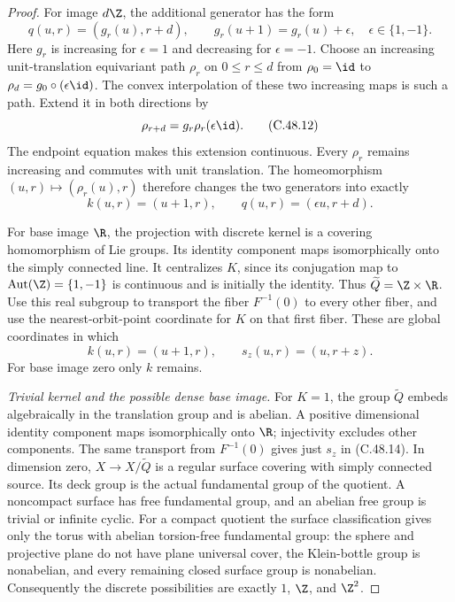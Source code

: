 \begin{proof}
For image $d\Z$, the additional generator has the form
\[
 q(u,r)=(g_r(u),r+d),\qquad
 g_r(u+1)=g_r(u)+\epsilon,\quad\epsilon\in\{1,-1\}.
                                                        \tag{C.48.11}
\]
Here $g_r$ is increasing for $\epsilon=1$ and decreasing
for $\epsilon=-1$. Choose an increasing unit-translation
equivariant path $\rho_r$ on $0\leq r\leq d$ from
$\rho_0=\id$ to $\rho_d=g_0\circ(\epsilon\id)$.
The convex interpolation of these two increasing maps
is such a path. Extend it in both directions by
\[
                 \rho_{r+d}=g_r\rho_r(\epsilon\id).
                                                        \tag{C.48.12}
\]
The endpoint equation makes this extension continuous.
Every $\rho_r$ remains increasing and commutes with unit
translation. The homeomorphism $(u,r)\mapsto(\rho_r(u),r)$
therefore changes the two generators into exactly
\[
                 k(u,r)=(u+1,r),\qquad
                 q(u,r)=(\epsilon u,r+d).              \tag{C.48.13}
\]

For base image $\R$, the projection with discrete kernel
is a covering homomorphism of Lie groups. Its identity
component maps isomorphically onto the simply connected
line. It centralizes $K$, since its conjugation map to
$\operatorname{Aut}(\Z)=\{1,-1\}$ is continuous and is
initially the identity. Thus
$\widetilde Q=\Z\times\R$. Use this real subgroup to
transport the fiber $F^{-1}(0)$ to every other fiber,
and use the nearest-orbit-point coordinate for $K$ on
that first fiber. These are global coordinates in which
\[
           k(u,r)=(u+1,r),\qquad s_z(u,r)=(u,r+z).
                                                        \tag{C.48.14}
\]
For base image zero only $k$ remains.

\emph{Trivial kernel and the possible dense base image.}
For $K=1$, the group $\widetilde Q$ embeds algebraically
in the translation group and is abelian. A positive
dimensional identity component maps isomorphically onto
$\R$; injectivity excludes other components. The same
transport from $F^{-1}(0)$ gives just $s_z$ in (C.48.14).
In dimension zero, $X\to X/\widetilde Q$ is a regular
surface covering with simply connected source. Its deck
group is the actual fundamental group of the quotient.
A noncompact surface has free fundamental group, and
an abelian free group is trivial or infinite cyclic.
For a compact quotient the surface classification gives
only the torus with abelian torsion-free fundamental
group: the sphere and projective plane do not have plane
universal cover, the Klein-bottle group is nonabelian,
and every remaining closed surface group is nonabelian.
Consequently the discrete possibilities are exactly
$1$, $\Z$, and $\Z^2$.


\end{proof}
